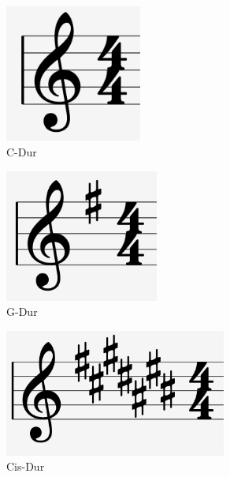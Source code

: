 \begin{minipage}[b]{0.3\linewidth}
    \begin{figure}[H]
        \centering
        \includegraphics[width=0.4\textwidth]{images/Signiture_2}
        \caption[]{C-Dur}
        \label{fig:CDur}
    \end{figure}
  \end{minipage}
  \begin{minipage}[b]{0.3\linewidth}
    \begin{figure}[H]
        \centering
        \includegraphics[width=0.45\textwidth]{images/Signiture_3}
        \caption[]{G-Dur}
        \label{fig:GDur}
    \end{figure}
  \end{minipage}
  \begin{minipage}[b]{0.3\linewidth}
    \begin{figure}[H]
        \centering
        \includegraphics[width=0.65\textwidth]{images/Signiture_1}
        \caption[]{Cis-Dur}
        \label{fig:CisDur}
    \end{figure}
  \end{minipage}

